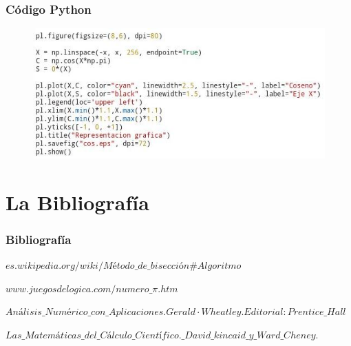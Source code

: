 \documentclass{beamer}
\begin{document}
\begin{frame}
\frametitle{Código \textsf{Python}}

\begin{figure}[b]
\begin{center}
\includegraphics[scale=0.75]{python4.jpeg}
\end{center}
\end{figure}
\end{frame}

\section{La Bibliografía}

\begin{frame}
\frametitle{Bibliografía}
\begin{thebibliography}
  \beamertermplatebookbibitems
  {\small $es.wikipedia.org/wiki/Método\_de\_bisección\#Algoritmo$}
  
  \beamertermplatebookbibitems
  {\small $www.juegosdelogica.com/numero\_\pi.htm$}
  
  \beamertermplatebookbibitems
  {\small $Análisis\_Numérico\_con\_Aplicaciones. Gerald·Wheatley. Editorial: Prentice\_Hall$}
  
  \beamertermplatebookbibitems
  {\small $Las\_Matemáticas\_del\_Cálculo\_Científico.\_David \_kincaid\_y\_Ward\_Cheney.$}
  
\end{thebibliography}
\end{frame}
\end{document}

